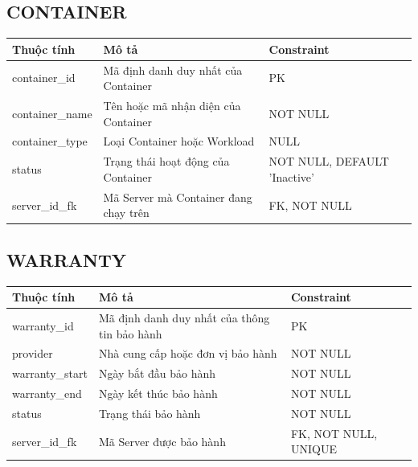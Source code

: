 \subsection{CONTAINER}
\begin{center}
\begin{longtable}{|>{\raggedright\arraybackslash}p{3.5cm}|>{\raggedright\arraybackslash}p{6.5cm}|>{\raggedright\arraybackslash}p{4.5cm}|}
\hline
\textbf{Thuộc tính} & \textbf{Mô tả} & \textbf{Constraint} \\ \hline
\endhead
container\_id & Mã định danh duy nhất của Container & PK \\ \hline
container\_name & Tên hoặc mã nhận diện của Container & NOT NULL \\ \hline
container\_type & Loại Container hoặc Workload & NULL \\ \hline
status & Trạng thái hoạt động của Container & NOT NULL, DEFAULT 'Inactive' \\ \hline
server\_id\_fk & Mã Server mà Container đang chạy trên & FK, NOT NULL \\ \hline
\end{longtable}
\end{center}

\subsection{WARRANTY}
\begin{center}
\begin{longtable}{|>{\raggedright\arraybackslash}p{3.5cm}|>{\raggedright\arraybackslash}p{6.5cm}|>{\raggedright\arraybackslash}p{4.5cm}|}
\hline
\textbf{Thuộc tính} & \textbf{Mô tả} & \textbf{Constraint} \\ \hline
\endhead
warranty\_id & Mã định danh duy nhất của thông tin bảo hành & PK \\ \hline
provider & Nhà cung cấp hoặc đơn vị bảo hành & NOT NULL \\ \hline
warranty\_start & Ngày bắt đầu bảo hành & NOT NULL \\ \hline
warranty\_end & Ngày kết thúc bảo hành & NOT NULL \\ \hline
status & Trạng thái bảo hành & NOT NULL \\ \hline
server\_id\_fk & Mã Server được bảo hành & FK, NOT NULL, UNIQUE \\ \hline
\end{longtable}
\end{center}

